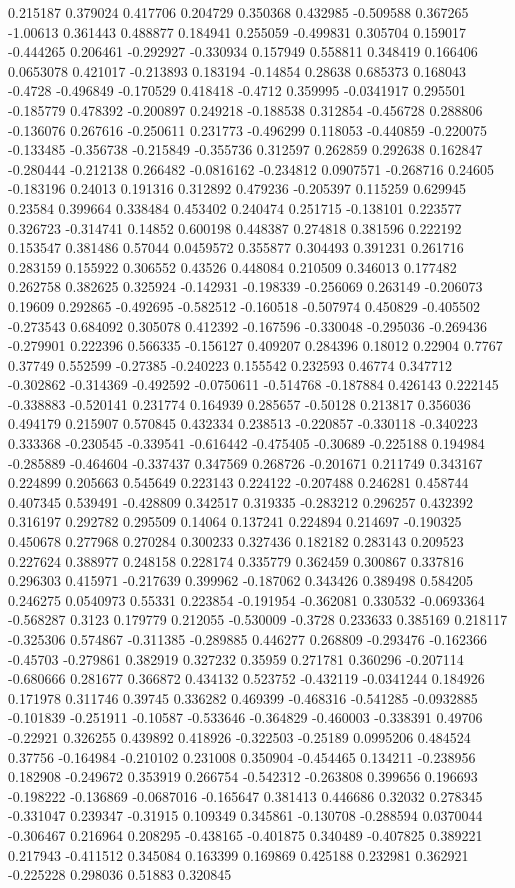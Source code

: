 0.215187 0.379024 0.417706 0.204729 0.350368 0.432985 -0.509588 0.367265 -1.00613 0.361443 0.488877 0.184941 0.255059 -0.499831 0.305704 0.159017 -0.444265 0.206461 -0.292927 -0.330934 0.157949 0.558811 0.348419 0.166406 0.0653078 0.421017 -0.213893 0.183194 -0.14854 0.28638 0.685373 0.168043 -0.4728 -0.496849 -0.170529 0.418418 -0.4712 0.359995 -0.0341917 0.295501 -0.185779 0.478392 -0.200897 0.249218 -0.188538 0.312854 -0.456728 0.288806 -0.136076 0.267616 -0.250611 0.231773 -0.496299 0.118053 -0.440859 -0.220075 -0.133485 -0.356738 -0.215849 -0.355736 0.312597 0.262859 0.292638 0.162847 -0.280444 -0.212138 0.266482 -0.0816162 -0.234812 0.0907571 -0.268716 0.24605 -0.183196 0.24013 0.191316 0.312892 0.479236 -0.205397 0.115259 0.629945 0.23584 0.399664 0.338484 0.453402 0.240474 0.251715 -0.138101 0.223577 0.326723 -0.314741 0.14852 0.600198 0.448387 0.274818 0.381596 0.222192 0.153547 0.381486 0.57044 0.0459572 0.355877 0.304493 0.391231 0.261716 0.283159 0.155922 0.306552 0.43526 0.448084 0.210509 0.346013 0.177482 0.262758 0.382625 0.325924 -0.142931 -0.198339 -0.256069 0.263149 -0.206073 0.19609 0.292865 -0.492695 -0.582512 -0.160518 -0.507974 0.450829 -0.405502 -0.273543 0.684092 0.305078 0.412392 -0.167596 -0.330048 -0.295036 -0.269436 -0.279901 0.222396 0.566335 -0.156127 0.409207 0.284396 0.18012 0.22904 0.7767 0.37749 0.552599 -0.27385 -0.240223 0.155542 0.232593 0.46774 0.347712 -0.302862 -0.314369 -0.492592 -0.0750611 -0.514768 -0.187884 0.426143 0.222145 -0.338883 -0.520141 0.231774 0.164939 0.285657 -0.50128 0.213817 0.356036 0.494179 0.215907 0.570845 0.432334 0.238513 -0.220857 -0.330118 -0.340223 0.333368 -0.230545 -0.339541 -0.616442 -0.475405 -0.30689 -0.225188 0.194984 -0.285889 -0.464604 -0.337437 0.347569 0.268726 -0.201671 0.211749 0.343167 0.224899 0.205663 0.545649 0.223143 0.224122 -0.207488 0.246281 0.458744 0.407345 0.539491 -0.428809 0.342517 0.319335 -0.283212 0.296257 0.432392 0.316197 0.292782 0.295509 0.14064 0.137241 0.224894 0.214697 -0.190325 0.450678 0.277968 0.270284 0.300233 0.327436 0.182182 0.283143 0.209523 0.227624 0.388977 0.248158 0.228174 0.335779 0.362459 0.300867 0.337816 0.296303 0.415971 -0.217639 0.399962 -0.187062 0.343426 0.389498 0.584205 0.246275 0.0540973 0.55331 0.223854 -0.191954 -0.362081 0.330532 -0.0693364 -0.568287 0.3123 0.179779 0.212055 -0.530009 -0.3728 0.233633 0.385169 0.218117 -0.325306 0.574867 -0.311385 -0.289885 0.446277 0.268809 -0.293476 -0.162366 -0.45703 -0.279861 0.382919 0.327232 0.35959 0.271781 0.360296 -0.207114 -0.680666 0.281677 0.366872 0.434132 0.523752 -0.432119 -0.0341244 0.184926 0.171978 0.311746 0.39745 0.336282 0.469399 -0.468316 -0.541285 -0.0932885 -0.101839 -0.251911 -0.10587 -0.533646 -0.364829 -0.460003 -0.338391 0.49706 -0.22921 0.326255 0.439892 0.418926 -0.322503 -0.25189 0.0995206 0.484524 0.37756 -0.164984 -0.210102 0.231008 0.350904 -0.454465 0.134211 -0.238956 0.182908 -0.249672 0.353919 0.266754 -0.542312 -0.263808 0.399656 0.196693 -0.198222 -0.136869 -0.0687016 -0.165647 0.381413 0.446686 0.32032 0.278345 -0.331047 0.239347 -0.31915 0.109349 0.345861 -0.130708 -0.288594 0.0370044 -0.306467 0.216964 0.208295 -0.438165 -0.401875 0.340489 -0.407825 0.389221 0.217943 -0.411512 0.345084 0.163399 0.169869 0.425188 0.232981 0.362921 -0.225228 0.298036 0.51883 0.320845 